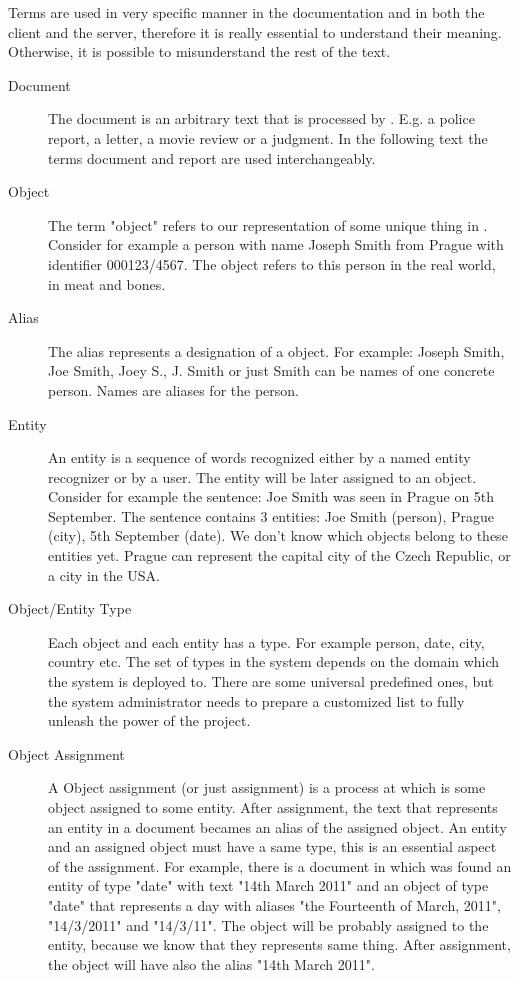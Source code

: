 Terms are used in very specific manner in the documentation and in both the
client and the server, therefore it is really essential to understand their
meaning. Otherwise, it is possible to misunderstand the rest of the text.

\begin{description}
\item[Document]
The document is an arbitrary text that is processed by \textan{}. E.g. a police
report, a letter, a movie review or a judgment. In the following text the terms
document and report are used interchangeably.

\item[Object]
The term "object" refers to our representation of some unique thing in
\textan{}. Consider for example a person with name Joseph Smith from Prague with
identifier 000123/4567. The object refers to this person in the real world, in
meat and bones.

\item[Alias]
The alias represents a designation of a object. For example: Joseph Smith, Joe
Smith, Joey S., J. Smith or just Smith can be names of one concrete person.
Names are aliases for the person.

\item[Entity]
An entity is a sequence of words recognized either by a named entity recognizer
or by a user. The entity will be later assigned to an object. Consider for example
the sentence: Joe Smith was seen in Prague on 5th September. The sentence contains
3 entities: Joe Smith (person), Prague (city), 5th September (date). We don't know
which objects belong to these entities yet. Prague can represent the capital city
of the Czech Republic, or a city in the USA.

\item[Object/Entity Type]
Each object and each entity has a type. For example person, date, city, country
etc. The set of types in the system depends on the domain which the system is
deployed to. There are some universal predefined  ones, but the system
administrator needs to prepare a customized list to fully unleash the power of
the project. 

\item[Object Assignment]
A Object assignment (or just assignment) is a process at which is some object
assigned to some entity.  After assignment, the text that represents an entity
in a document becames an alias of the assigned object. An entity and an assigned
object must have a same type, this is an essential aspect of the assignment.
For example, there is a document in which was found an entity of type "date" with
text "14th March 2011" and an object of type "date" that represents a day with
aliases "the Fourteenth of March, 2011", "14/3/2011" and "14/3/11". The object will
be probably assigned to the entity, because we know that they represents same thing.
After assignment, the object will have also the alias "14th March 2011".


\end{description}
